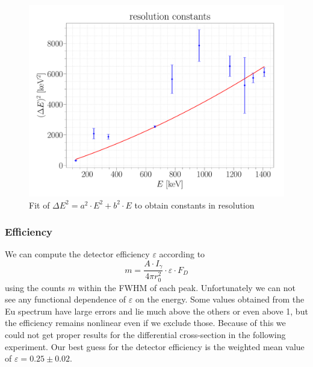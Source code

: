 \documentclass[a4paper,12pt]{article}
\begin{document}
\begin{figure}[H]
\centering
\includegraphics[scale=0.25]{../Figures/resolution constants.pdf}
\caption{Fit of $\Delta E^2 = a^2 \cdot E^2 + b^2 \cdot E$ to obtain constants in resolution}
\label{resolutionFit}
\end{figure}


\subsubsection{Efficiency}

We can compute the detector efficiency $\varepsilon$ according to 
\begin{equation}
	m = \frac{A \cdot I_\gamma}{4 \pi r_0^2} \cdot \varepsilon \cdot F_D
\end{equation}
using the counts $m$ within the FWHM of each peak. Unfortunately we can not see any functional dependence of $\varepsilon$ on the energy. Some values obtained from the Eu spectrum have large errors and lie much above the others or even above 1, but the efficiency remains nonlinear even if we exclude those. Because of this we could not get proper results for the differential cross-section in the following experiment. Our best guess for the detector efficiency is the weighted mean value of $\varepsilon = 0.25 \pm 0.02$.
\end{document}
